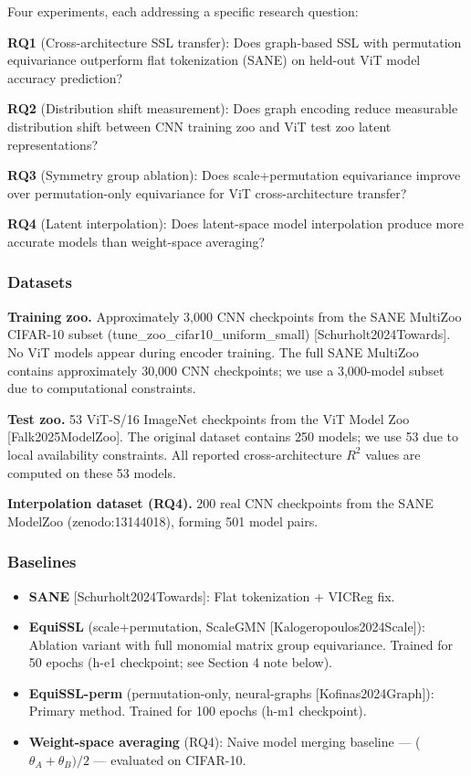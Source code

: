 
Four experiments, each addressing a specific research question:

\textbf{RQ1} (Cross-architecture SSL transfer): Does graph-based SSL with permutation equivariance outperform flat tokenization (SANE) on held-out ViT model accuracy prediction?

\textbf{RQ2} (Distribution shift measurement): Does graph encoding reduce measurable distribution shift between CNN training zoo and ViT test zoo latent representations?

\textbf{RQ3} (Symmetry group ablation): Does scale+permutation equivariance improve over permutation-only equivariance for ViT cross-architecture transfer?

\textbf{RQ4} (Latent interpolation): Does latent-space model interpolation produce more accurate models than weight-space averaging?

\subsubsection{Datasets}

\textbf{Training zoo.} Approximately 3,000 CNN checkpoints from the SANE MultiZoo CIFAR-10 subset (tune\_zoo\_cifar10\_uniform\_small) [Schurholt2024Towards]. No ViT models appear during encoder training. The full SANE MultiZoo contains approximately 30,000 CNN checkpoints; we use a 3,000-model subset due to computational constraints.

\textbf{Test zoo.} 53 ViT-S/16 ImageNet checkpoints from the ViT Model Zoo [Falk2025ModelZoo]. The original dataset contains 250 models; we use 53 due to local availability constraints. All reported cross-architecture $R^2$ values are computed on these 53 models.

\textbf{Interpolation dataset (RQ4).} 200 real CNN checkpoints from the SANE ModelZoo (zenodo:13144018), forming 501 model pairs.

\subsubsection{Baselines}

\begin{itemize}
\item \textbf{SANE} [Schurholt2024Towards]: Flat tokenization + VICReg fix.
\item \textbf{EquiSSL} (scale+permutation, ScaleGMN [Kalogeropoulos2024Scale]): Ablation variant with full monomial matrix group equivariance. Trained for 50 epochs (h-e1 checkpoint; see Section 4 note below).
\item \textbf{EquiSSL-perm} (permutation-only, neural-graphs [Kofinas2024Graph]): Primary method. Trained for 100 epochs (h-m1 checkpoint).
\item \textbf{Weight-space averaging} (RQ4): Naive model merging baseline --- ($\theta _A + \theta _{B})/2$ --- evaluated on CIFAR-10.
\end{itemize}

